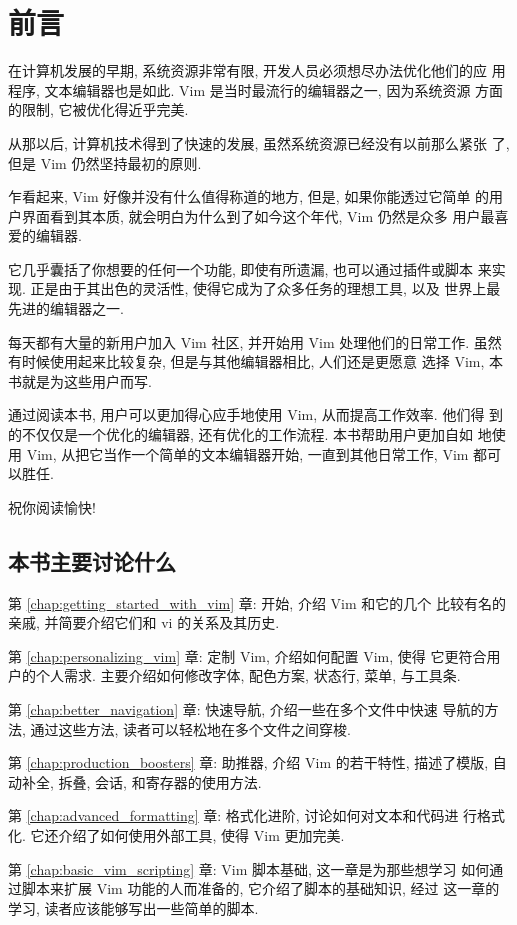 \chapter{前言}
\label{chap:preface}
在计算机发展的早期, 系统资源非常有限, 开发人员必须想尽办法优化他们的应
用程序, 文本编辑器也是如此. Vim 是当时最流行的编辑器之一, 因为系统资源
方面的限制, 它被优化得近乎完美.

从那以后, 计算机技术得到了快速的发展, 虽然系统资源已经没有以前那么紧张
了, 但是 Vim 仍然坚持最初的原则.

乍看起来, Vim 好像并没有什么值得称道的地方, 但是, 如果你能透过它简单
的用户界面看到其本质, 就会明白为什么到了如今这个年代, Vim 仍然是众多
用户最喜爱的编辑器.

它几乎囊括了你想要的任何一个功能, 即使有所遗漏, 也可以通过插件或脚本
来实现. 正是由于其出色的灵活性, 使得它成为了众多任务的理想工具, 以及
世界上最先进的编辑器之一.

每天都有大量的新用户加入 Vim 社区, 并开始用 Vim 处理他们的日常工作.
虽然有时候使用起来比较复杂, 但是与其他编辑器相比, 人们还是更愿意
选择 Vim, 本书就是为这些用户而写.

通过阅读本书, 用户可以更加得心应手地使用 Vim, 从而提高工作效率. 他们得
到的不仅仅是一个优化的编辑器, 还有优化的工作流程. 本书帮助用户更加自如
地使用 Vim, 从把它当作一个简单的文本编辑器开始, 一直到其他日常工作, Vim
都可以胜任.

祝你阅读愉快!

\section*{本书主要讨论什么}
第 \ref{chap:getting_started_with_vim} 章: 开始, 介绍 Vim 和它的几个
比较有名的亲戚, 并简要介绍它们和 vi 的关系及其历史.

第 \ref{chap:personalizing_vim} 章: 定制 Vim, 介绍如何配置 Vim, 使得
它更符合用户的个人需求. 主要介绍如何修改字体, 配色方案, 状态行, 菜单,
与工具条.

第 \ref{chap:better_navigation} 章: 快速导航, 介绍一些在多个文件中快速
导航的方法, 通过这些方法, 读者可以轻松地在多个文件之间穿梭.

第 \ref{chap:production_boosters} 章: 助推器, 介绍 Vim 的若干特性,
描述了模版, 自动补全, 拆叠, 会话, 和寄存器的使用方法.

第 \ref{chap:advanced_formatting} 章: 格式化进阶, 讨论如何对文本和代码进
行格式化. 它还介绍了如何使用外部工具, 使得 Vim 更加完美.

第 \ref{chap:basic_vim_scripting} 章: Vim 脚本基础, 这一章是为那些想学习
如何通过脚本来扩展 Vim 功能的人而准备的, 它介绍了脚本的基础知识, 经过
这一章的学习, 读者应该能够写出一些简单的脚本.

